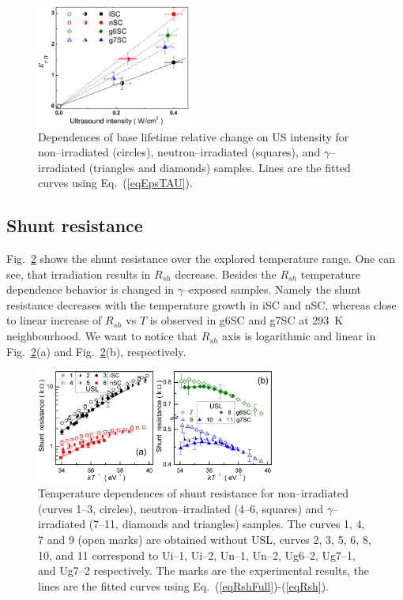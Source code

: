 \documentclass[aip,jap, amsmath,amssymb,reprint]{revtex4-1}
\begin{document}
\begin{figure}
\includegraphics[width=0.45\textwidth]{fig_8}%
\caption{\label{fig_Kus}
Dependences of base lifetime relative change on US intensity for non--irradiated (circles), neutron--irradiated (squares), and $\gamma$--irradiated
(triangles and diamonds) samples.
Lines are the fitted curves using Eq.~(\ref{eqEpsTAU}).
}%
\end{figure}

\subsection{Shunt resistance\label{Rsh}}
Fig.~\ref{fig_Rsh} shows the  shunt resistance  over the explored temperature range.
One can see, that irradiation results in $R_{sh}$ decrease.
Besides the $R_{sh}$ temperature dependence behavior is changed in $\gamma$--exposed samples.
Namely the shunt resistance decreases with the temperature growth in iSC and nSC,
whereas close to linear increase of $R_{sh}$ vs $T$  is observed in g6SC and g7SC at 293~K neighbourhood.
We want to notice that $R_{sh}$ axis is logarithmic and linear in Fig.~\ref{fig_Rsh}(a) and Fig.~\ref{fig_Rsh}(b), respectively.

\begin{figure}
\includegraphics[width=0.7\textwidth]{fig_9ab}%
\caption{\label{fig_Rsh}
Temperature dependences of shunt resistance for non--irradiated (curves 1--3, circles),
neutron--irradiated (4--6, squares) and $\gamma$--irradiated (7--11, diamonds and triangles) samples.
The curves 1, 4, 7 and 9 (open marks) are obtained without USL,
curves 2, 3, 5, 6, 8, 10, and 11 correspond to
Ui--1, Ui--2, Un--1, Un--2, Ug6--2, Ug7--1, and Ug7--2 respectively.
The marks are the experimental results, the lines are the fitted curves using Eq.~(\ref{eqRshFull})-(\ref{eqRsh}).
}%
\end{figure}
\end{document}
